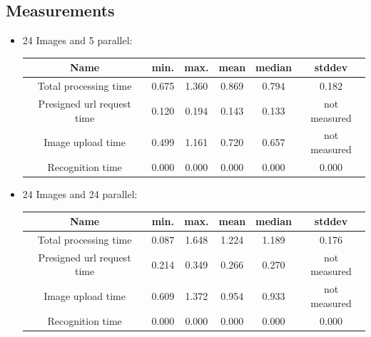 \documentclass[conference]{IEEEtran}
\begin{document}
\subsection{Measurements}
\begin{itemize}
	\item 24 Images and 5 parallel:
	\begin{table}[h]
		\begin{tabulary}{\textwidth}{|C|C|C|C|C|C|}
			\hline
			\textbf{Name} &
			\textbf{min.} &
			\textbf{max.} &
			\textbf{mean} &
			\textbf{median} &
			\textbf{stddev}
			\\\hline
			Total processing time & 0.675 & 1.360 & 0.869 & 0.794 & 0.182 \\\hline
			Presigned url request time & 0.120 & 0.194 & 0.143 & 0.133 & not measured \\\hline
			Image upload time & 0.499 & 1.161 & 0.720 & 0.657 & not measured \\\hline
			Recognition time & 0.000 & 0.000 & 0.000 & 0.000 & 0.000 \\\hline
		\end{tabulary} 
	\end{table}
	
	\item 	 24 Images and 24 parallel:
	\begin{table}[h]
		\begin{tabulary}{\textwidth}{|C|C|C|C|C|C|}
			\hline
			\textbf{Name} &
			\textbf{min.} &
			\textbf{max.} &
			\textbf{mean} &
			\textbf{median} &
			\textbf{stddev}
			\\\hline
			Total processing time & 0.087 & 1.648 & 1.224 & 1.189 & 0.176 \\\hline
			Presigned url request time & 0.214 & 0.349 & 0.266 & 0.270 & not measured \\\hline
			Image upload time & 0.609 & 1.372 & 0.954 & 0.933 & not measured \\\hline
			Recognition time & 0.000 & 0.000 & 0.000 & 0.000 & 0.000 \\\hline
		\end{tabulary} 
	\end{table}
	

\end{itemize}
\end{document}
